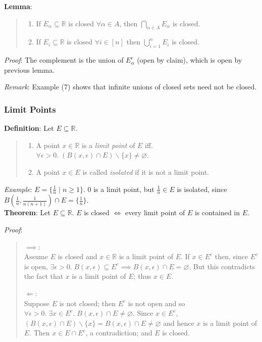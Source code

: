 \documentclass[11pt]{article}
\begin{document}
\textbf{Lemma}:
\begin{quote}\vspace{-0.3cm}
	\begin{enumerate}
	\item If $E_\alpha \subseteq \mathbb{R}$ is closed $\forall \alpha \in A$, then $\bigcap_{\alpha \in A} E_\alpha$ is closed.
	\item If $E_i \subseteq \mathbb{R}$ is closed $\forall i \in [n]$ then $\bigcup_{i=1}^n E_i$ is closed.
	\end{enumerate}
\end{quote}
\emph{Proof}: The complement is the union of $E_\alpha^c$ (open by claim), which is open by previous lemma.

\emph{Remark}: Example (7) shows that infinite unions of closed sets need not be closed.

\subsubsection{Limit Points}

\textbf{Definition}: Let $E \subseteq \mathbb{R}$.
\begin{quote}\vspace{-0.3cm}
	\begin{enumerate}
	\item A point $x \in \mathbb{R}$ is a \emph{limit point} of $E$ iff. $\forall \epsilon > 0.\; (B(x, \epsilon) \cap E) \backslash \{x\} \neq \varnothing$.
	\item A point $x \in E$ is called \emph{isolated} if it is not a limit point.
	\end{enumerate}
\end{quote}
\emph{Example}: $E = \{\frac{1}{n} \mid n \geq 1\}$. 0 is a limit point, but $\frac{1}{n} \in E$ is isolated, since $B(\frac{1}{n}, \frac{1}{n(n+1)}) \cap E = \{\frac{1}{n}\}$.\\

\textbf{Theorem}: Let $E \subseteq \mathbb{R}$. $E$ is closed $\iff$ every limit point of $E$ is contained in $E$.

\emph{Proof}:
\begin{quote}\vspace{-0.3cm}
$\implies$:\\
Assume $E$ is closed and $x \in \mathbb{R}$ is a limit point of $E$. If $x \in E^c$ then, since $E^c$ is open, $\exists \epsilon > 0.\; B(x, \epsilon) \subseteq E^c \implies B(x, \epsilon) \cap E = \varnothing$. But this contradicts the fact that $x$ is a limit point of $E$; thus $x \in E$.

$\Longleftarrow$:\\
Suppose $E$ is not closed; then $E^c$ is not open and so $\forall \epsilon > 0.\; \exists x \in E^c.\; B(x, \epsilon) \cap E \neq \varnothing$. Since $x \in E^c$, $(B(x, \epsilon) \cap E) \backslash \{x\} = B(x, \epsilon) \cap E \neq \varnothing$ and hence $x$ is a limit point of $E$. Then $x \in E \cap E^c$, a contradiction; and $E$ is closed.
\end{quote}
\end{document}
